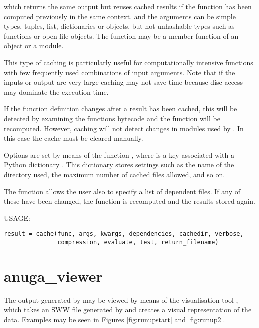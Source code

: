 \documentclass{manual}
\begin{document}
which returns the same output but reuses cached
results if the function has been computed previously in the same context.
 and the arguments can be simple types, tuples, list, dictionaries or
objects, but not unhashable types such as functions or open file objects.
The function  may be a member function of an object or a module.

This type of caching is particularly useful for computationally intensive
functions with few frequently used combinations of input arguments. Note that
if the inputs or output are very large caching may not save time because
disc access may dominate the execution time.

If the function definition changes after a result has been cached, this will be
detected by examining the functions bytecode and the function will be recomputed.
However, caching will not detect changes in modules used by .
In this case the cache must be cleared manually.

Options are set by means of the function ,
where  is a key associated with a
Python dictionary . This dictionary stores settings such as the name of
the directory used, the maximum number of cached files allowed, and so on.

The  function allows the user also to specify a list of dependent files. If any of these
have been changed, the function is recomputed and the results stored again.


USAGE: \nopagebreak

\begin{verbatim}
result = cache(func, args, kwargs, dependencies, cachedir, verbose,
               compression, evaluate, test, return_filename)
\end{verbatim}



\pagebreak
\section{anuga\_viewer}
\label{sec:anuga_viewer}

The output generated by \anuga may be viewed by
means of the visualisation tool , which takes an
SWW file generated by \anuga and creates a visual representation
of the data. Examples may be seen in Figures \ref{fig:runupstart}
and \ref{fig:runup2}.
\end{document}
